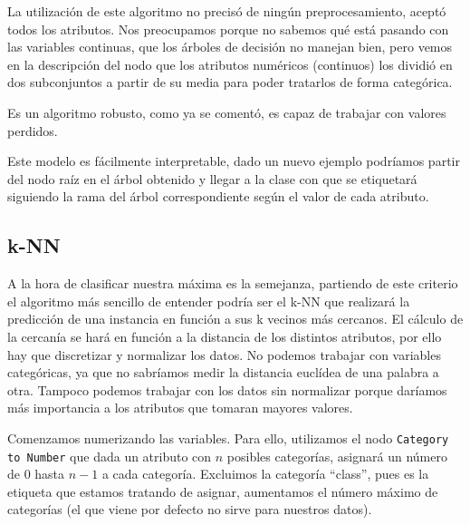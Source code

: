 \documentclass[a4paper, 20pt]{article}
\begin{document}
La utilización de este algoritmo no precisó de ningún preprocesamiento, aceptó todos los atributos. Nos preocupamos porque no sabemos qué está pasando con las variables continuas, que los árboles de decisión no manejan bien, pero vemos en la descripción del nodo que los atributos numéricos (continuos) los dividió en dos subconjuntos a partir de su media para poder tratarlos de forma categórica.

Es un algoritmo robusto, como ya se comentó, es capaz de trabajar con valores perdidos.

Este modelo es fácilmente interpretable, dado un nuevo ejemplo podríamos partir del nodo raíz en el árbol obtenido y llegar a la clase con que se etiquetará siguiendo la rama del árbol correspondiente según el valor de cada atributo.



\subsection{k-NN}
A la hora de clasificar nuestra máxima es la semejanza, partiendo de este criterio el algoritmo más sencillo de entender podría ser el k-NN que realizará la predicción de una instancia en función a sus k vecinos más cercanos. El cálculo de la cercanía se hará en función a la distancia de los distintos atributos, por ello hay que discretizar y normalizar los datos. No podemos trabajar con variables categóricas, ya que no sabríamos medir la distancia euclídea de una palabra a otra. Tampoco podemos trabajar con los datos sin normalizar porque daríamos más importancia a los atributos que tomaran mayores valores.

Comenzamos numerizando las variables. Para ello, utilizamos el nodo \texttt{Category to Number} que dada un atributo con $n$ posibles categorías, asignará un número de 0 hasta $n-1$ a cada categoría. Excluimos la categoría ``class'', pues es la etiqueta que estamos tratando de asignar, aumentamos el número máximo de categorías (el que viene por defecto no sirve para nuestros datos).
\end{document}
